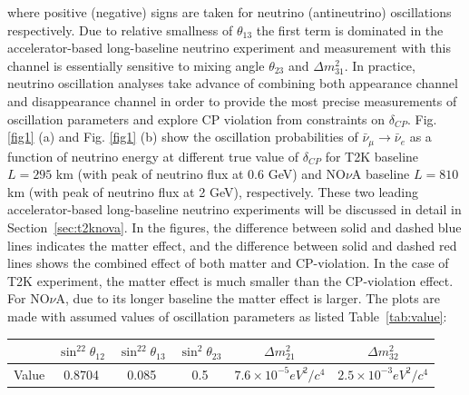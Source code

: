 \documentclass[a4 paper,12pt]{report}%
\begin{document}
where positive (negative) signs are taken for neutrino (antineutrino) oscillations respectively. Due to relative smallness of $\theta_{13}$ the first term is dominated in the accelerator-based long-baseline neutrino experiment and measurement with this channel is essentially sensitive to mixing angle $\theta_{23}$ and $\Delta m^2_{31}$. In practice, neutrino oscillation analyses take advance of combining both appearance channel and disappearance channel in order to provide the most precise measurements of oscillation parameters and explore CP violation from constraints on $\delta_{CP}$. Fig. \ref{fig1} (a) and Fig. \ref{fig1} (b) show the oscillation probabilities of $\bar{\nu}_{\mu} \rightarrow \bar{\nu}_{e}$ as a function of neutrino energy at different true value of $\delta_{CP}$ for T2K baseline $L = 295$ km (with peak of neutrino flux at 0.6 GeV) and NO$\nu$A baseline $L=810$ km (with peak of neutrino flux at 2 GeV), respectively. These two leading accelerator-based long-baseline neutrino experiments will be discussed in detail in Section~\ref{sec:t2knova}. In the figures, the difference between solid and dashed blue lines indicates the matter effect, and the difference between solid and dashed red lines shows the combined effect of both matter and CP-violation. In the case of T2K experiment, the matter effect is much smaller than the CP-violation effect. For NO$\nu$A, due to its longer baseline the matter effect is larger. The plots are made with assumed values of oscillation parameters as listed Table~\ref{tab:value}: \par 
\begin{center}
\label{tab:value}
\begin{tabular}{|c| c| c| c| c| c|}
\hline
&$\sin^22\theta_{12}$ &$\sin^22\theta_{13}$ &$\sin^2\theta_{23}$&$\Delta m^2_{21}$ & $\Delta m^2_{32}$\\
\hline
Value& 0.8704 & 0.085 & 0.5 & $7.6 \times 10^{-5} eV^2/c^4$& $2.5 \times 10^{-3} eV^2/c^4$ \\
\hline
\end{tabular}
\end{center}
\end{document}
